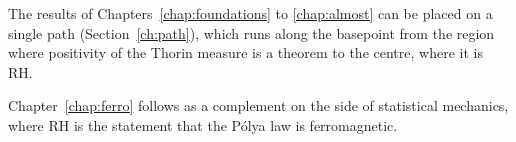 \label{chap:conclusions}

The results of Chapters~\ref{chap:foundations} to \ref{chap:almost} can be placed on a single path (Section~\ref{ch:path}), which runs along the basepoint from the region where positivity of the Thorin measure is a theorem to the centre, where it is RH.

Chapter~\ref{chap:ferro} follows as a complement on the side of statistical mechanics, where RH is the statement that the P\'olya law is ferromagnetic.
